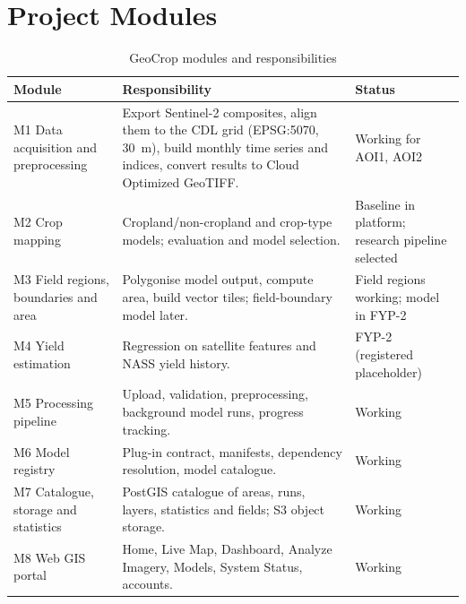 \section{Project Modules}
\begin{table}[htbp]
\centering\small
\caption{GeoCrop modules and responsibilities}
\label{tab:modules}
\begin{tabularx}{\textwidth}{L{4.2cm} Y L{2.2cm}}
\toprule
\textbf{Module} & \textbf{Responsibility} & \textbf{Status}\\
\midrule
M1 Data acquisition and preprocessing & Export Sentinel-2 composites, align them to the CDL grid (EPSG:5070, 30~m), build monthly time series and indices, convert results to Cloud Optimized GeoTIFF. & Working for AOI1, AOI2\\
M2 Crop mapping & Cropland/non-cropland and crop-type models; evaluation and model selection. & Baseline in platform; research pipeline selected\\
M3 Field regions, boundaries and area & Polygonise model output, compute area, build vector tiles; field-boundary model later. & Field regions working; model in FYP-2\\
M4 Yield estimation & Regression on satellite features and NASS yield history. & FYP-2 (registered placeholder)\\
M5 Processing pipeline & Upload, validation, preprocessing, background model runs, progress tracking. & Working\\
M6 Model registry & Plug-in contract, manifests, dependency resolution, model catalogue. & Working\\
M7 Catalogue, storage and statistics & PostGIS catalogue of areas, runs, layers, statistics and fields; S3 object storage. & Working\\
M8 Web GIS portal & Home, Live Map, Dashboard, Analyze Imagery, Models, System Status, accounts. & Working\\
\bottomrule
\end{tabularx}
\end{table}

